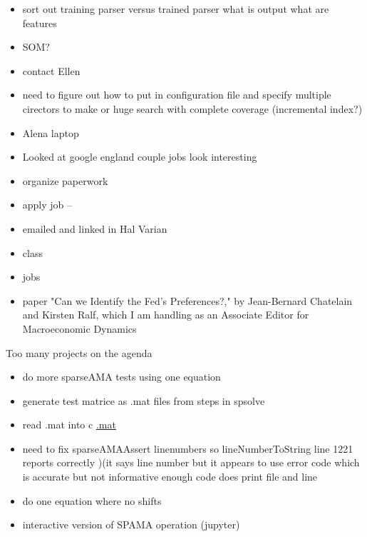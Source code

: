 \documentclass[hyperref]{labbook}
\begin{document}
\begin{itemize}
\item sort out training parser versus trained parser  what is output  what are features
\item SOM?
\item contact Ellen
\end{itemize}

\begin{itemize}
\item need to figure out how to put in configuration file and specify multiple cirectors to make or huge search with complete coverage  (incremental index?)
\item Alena laptop
\end{itemize}

\begin{itemize}
\item Looked at google england couple jobs look interesting
\item organize paperwork
\item apply job  -- 
\item emailed and linked in  Hal Varian 
\end{itemize}

\begin{itemize}
\item class
\item jobs
\end{itemize}

\begin{itemize}
\item paper "Can we Identify the Fed's Preferences?," by Jean-Bernard Chatelain and Kirsten Ralf, which I am handling as an Associate Editor for Macroeconomic Dynamics 
\end{itemize}


Too many projects on the agenda

\begin{itemize}
\item do more sparseAMA tests using one equation
\item generate test matrice as .mat files from steps in spsolve
\item read .mat into c \href{http://www.mathworks.com/help/matlab/matlab_external/_f30937.html}{.mat}
\item need to fix sparseAMAAssert linenumbers so lineNumberToString line 1221 reports correctly  )(it says line number but it appears to use error code which is accurate but not informative enough code does print file and line
\item do one equation where no shifts
\item interactive version of SPAMA operation  (jupyter)
\end{itemize}
\end{document}
